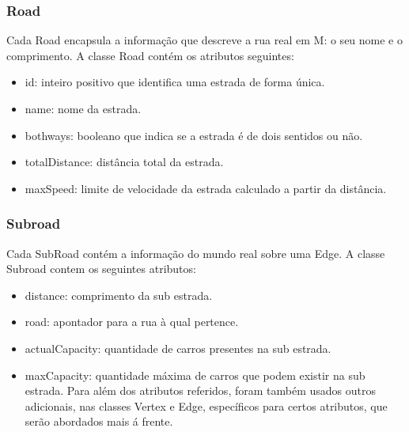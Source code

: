 \documentclass[relatorio.tex]{subfiles}
\begin{document}
\subsubsection{Road}
\label{subsubsec:road}

Cada Road encapsula a informação que descreve a rua real em M: o seu nome e o comprimento.
	A classe Road contém os atributos seguintes:

\begin{itemize}
\item id: inteiro positivo que identifica uma estrada de forma única.
\item name: nome da estrada.
\item bothways: booleano que indica se a estrada é de dois sentidos ou não.
\item totalDistance: distância total da estrada.
\item maxSpeed: limite de velocidade da estrada calculado a partir da distância.
\end{itemize}


\subsubsection{Subroad}
\label{subsubsec:subroad}

Cada SubRoad contém a informação do mundo real sobre uma Edge.
A classe Subroad contem os seguintes atributos:

\begin{itemize}
\item distance: comprimento da sub estrada.
\item road: apontador para a rua à qual pertence.
\item actualCapacity: quantidade de carros presentes na sub estrada.
\item maxCapacity: quantidade máxima de carros que podem existir na sub estrada.
Para além dos atributos referidos, foram também usados
outros adicionais, nas classes Vertex e Edge, específicos
para certos atributos, que serão abordados mais á frente.
\end{itemize}
\end{document}
